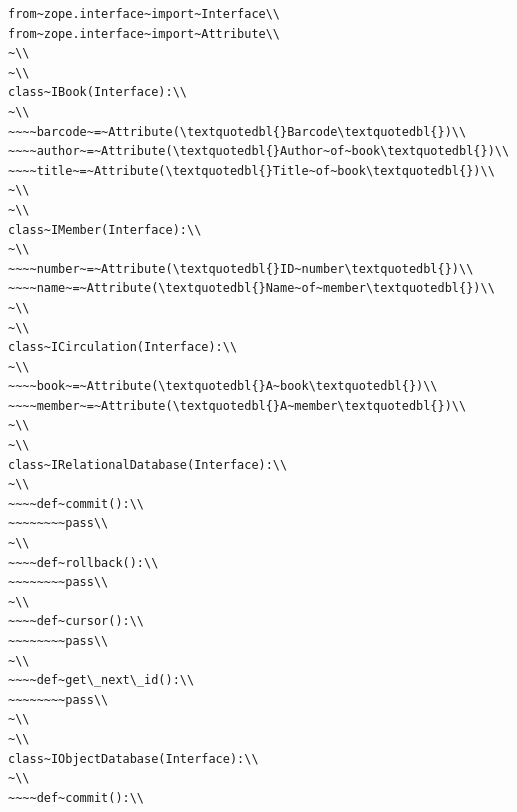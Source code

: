 \documentclass[a4paper,openany,twoside,draft]{book}
\begin{document}
\begin{verbatim}
from~zope.interface~import~Interface\\
from~zope.interface~import~Attribute\\
~\\
~\\
class~IBook(Interface):\\
~\\
~~~~barcode~=~Attribute(\textquotedbl{}Barcode\textquotedbl{})\\
~~~~author~=~Attribute(\textquotedbl{}Author~of~book\textquotedbl{})\\
~~~~title~=~Attribute(\textquotedbl{}Title~of~book\textquotedbl{})\\
~\\
~\\
class~IMember(Interface):\\
~\\
~~~~number~=~Attribute(\textquotedbl{}ID~number\textquotedbl{})\\
~~~~name~=~Attribute(\textquotedbl{}Name~of~member\textquotedbl{})\\
~\\
~\\
class~ICirculation(Interface):\\
~\\
~~~~book~=~Attribute(\textquotedbl{}A~book\textquotedbl{})\\
~~~~member~=~Attribute(\textquotedbl{}A~member\textquotedbl{})\\
~\\
~\\
class~IRelationalDatabase(Interface):\\
~\\
~~~~def~commit():\\
~~~~~~~~pass\\
~\\
~~~~def~rollback():\\
~~~~~~~~pass\\
~\\
~~~~def~cursor():\\
~~~~~~~~pass\\
~\\
~~~~def~get\_next\_id():\\
~~~~~~~~pass\\
~\\
~\\
class~IObjectDatabase(Interface):\\
~\\
~~~~def~commit():\\

\end{verbatim}
\end{document}
